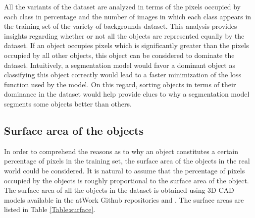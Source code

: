 	All the variants of the dataset are analyzed in terms of the pixels occupied by each class in percentage and the number of images in which each class appears in the training set of the variety of backgrounds dataset. This analysis provides insights regarding whether or not all the objects are represented equally by the dataset. If an object occupies pixels which is significantly greater than the pixels occupied by all other objects, this object can be considered to dominate the dataset. Intuitively, a segmentation model would favor a dominant object as classifying this object correctly would lead to a faster minimization of the loss function used by the model. On this regard, sorting objects in terms of their dominance in the dataset would help provide clues to why a segmentation model segments some objects better than others. 
	
	\subsection{Surface area of the objects}
		
		In order to comprehend the reasons as to why an object constitutes a certain percentage of pixels in the training set, the surface area of the objects in the real world could be considered. It is natural to assume that the percentage of pixels occupied by the objects is roughly proportional to the surface area of the object. The surface area of all the objects in the dataset is obtained using 3D CAD models available in the atWork Github repositories \cite{atwork_models} and \cite{atwork_models_rockin}. The surface areas are listed in Table \ref{Table:surface}.
		
